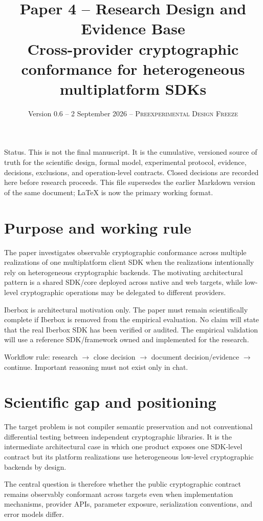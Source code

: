 \documentclass[11pt,a4paper]{article}
\title{Paper 4 -- Research Design and Evidence Base\\\large Cross-provider cryptographic conformance for heterogeneous multiplatform SDKs}
\author{}
\date{Version 0.6 -- 2 September 2026 -- \textsc{Preexperimental Design Freeze}}
\begin{document}
\maketitle
\tableofcontents
\newpage

Status. This is not the final manuscript. It is the cumulative, versioned source of truth for the scientific design, formal model, experimental protocol, evidence, decisions, exclusions, and operation-level contracts. Closed decisions are recorded here before research proceeds. This file supersedes the earlier Markdown version of the same document; LaTeX is now the primary working format.

\section{Purpose and working rule}
The paper investigates observable cryptographic conformance across multiple realizations of one multiplatform client SDK when the realizations intentionally rely on heterogeneous cryptographic backends. The motivating architectural pattern is a shared SDK/core deployed across native and web targets, while low-level cryptographic operations may be delegated to different providers.

Iberbox is architectural motivation only. The paper must remain scientifically complete if Iberbox is removed from the empirical evaluation. No claim will state that the real Iberbox SDK has been verified or audited. The empirical validation will use a reference SDK/framework owned and implemented for the research.

Workflow rule: research $\rightarrow$ close decision $\rightarrow$ document decision/evidence $\rightarrow$ continue. Important reasoning must not exist only in chat.

\section{Scientific gap and positioning}
The target problem is not compiler semantic preservation and not conventional differential testing between independent cryptographic libraries. It is the intermediate architectural case in which one product exposes one SDK-level contract but its platform realizations use heterogeneous low-level cryptographic backends by design.

The central question is therefore whether the public cryptographic contract remains observably conformant across targets even when implementation mechanisms, provider APIs, parameter exposure, serialization conventions, and error models differ.
\end{document}
